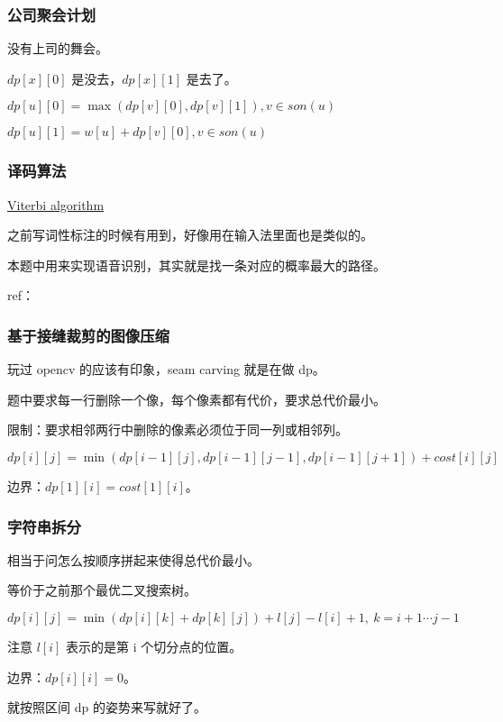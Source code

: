 \subsubsection{公司聚会计划}

没有上司的舞会。

$dp[x][0]$ 是没去，$dp[x][1]$ 是去了。

$dp[u][0] = \max(dp[v][0], dp[v][1]), v \in son(u)$

$dp[u][1] = w[u] + dp[v][0], v \in son(u)$

\subsubsection{译码算法}

\href{https://en.wikipedia.org/wiki/Viterbi_algorithm}{Viterbi algorithm}

之前写词性标注的时候有用到，好像用在输入法里面也是类似的。

本题中用来实现语音识别，其实就是找一条对应的概率最大的路径。

ref：\href{https://segmentfault.com/a/1190000008720143}{}

\subsubsection{基于接缝裁剪的图像压缩}

玩过 opencv 的应该有印象，seam carving 就是在做 dp。

题中要求每一行删除一个像，每个像素都有代价，要求总代价最小。

限制：要求相邻两行中删除的像素必须位于同一列或相邻列。

$dp[i][j] = \min(dp[i - 1][j], dp[i - 1][j - 1], dp[i - 1][j + 1]) + cost[i][j]$

边界：$dp[1][i] = cost[1][i]$。

\subsubsection{字符串拆分}

相当于问怎么按顺序拼起来使得总代价最小。

等价于之前那个最优二叉搜索树。

$dp[i][j] = \min(dp[i][k] + dp[k][j]) + l[j] - l[i] + 1,\ k = i + 1 \cdots j - 1$

注意 $l[i]$ 表示的是第 i 个切分点的位置。

边界：$dp[i][i] = 0$。

就按照区间 dp 的姿势来写就好了。

